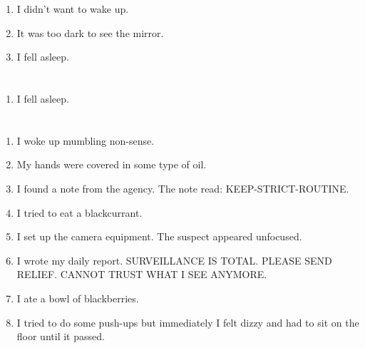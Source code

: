 \documentclass{article}
\begin{document}
    \begin{enumerate}
    
    \item I didn't want to wake up.\\
    
    \item It was too dark to see the mirror.\\
    
    \item I fell asleep.\\
    
    \end{enumerate}
     
    \newpage
    
    \section{}
    
    \begin{enumerate}
    
    \item I fell asleep.\\
    
    \end{enumerate}
     
    \newpage
    
    \section{}
    
    \begin{enumerate}
    
    \item I woke up mumbling non-sense.\\
    
    \item My hands were covered in some type of oil.\\
    
    \item I found a note from the agency. The note read: KEEP-STRICT-ROUTINE.\\
    
    \item I tried to eat a blackcurrant.\\
    
    \item I set up the camera equipment. The suspect appeared unfocused.\\
    
    \item I wrote my daily report. SURVEILLANCE IS TOTAL. PLEASE SEND RELIEF. CANNOT TRUST WHAT I SEE ANYMORE.\\
    
    \item I ate a bowl of blackberries.\\
    
    \item I tried to do some push-ups but immediately I felt dizzy and had to sit on the floor until it passed.\\
    
    \end{enumerate}
     
\end{document}
